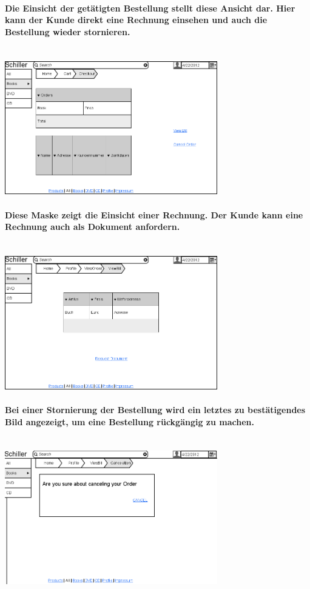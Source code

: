 \documentclass[a4paper]{article}
\begin{document}
\paragraph{Die Einsicht der getätigten Bestellung stellt diese Ansicht dar. Hier kann der Kunde direkt eine Rechnung einsehen und auch die Bestellung wieder stornieren.\\ \\}
\includegraphics[width=350px]{11OrderView.png}

\paragraph{Diese Maske zeigt die Einsicht einer Rechnung. Der Kunde kann eine Rechnung auch als Dokument anfordern.\\ \\}
\includegraphics[width=350px]{12BillView.png}

\paragraph{Bei einer Stornierung der Bestellung wird ein letztes zu bestätigendes Bild angezeigt, um eine Bestellung rückgängig zu machen.\\ \\}
\includegraphics[width=350px]{13Cancelation.png}
\end{document}
